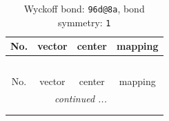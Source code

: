 \documentclass[fleqn,8pt]{jsarticle}
\begin{document}
\renewcommand{\arraystretch}{1.2}
\begin{longtable}{cccc}
\caption{Wyckoff bond: {\tt 96d@8a}, bond symmetry: {\tt 1}}
 \\
 \hline \hline
No. & vector & center & mapping \\ \hline \endfirsthead

\multicolumn{3}{l}{\tablename\ \thetable{}} \\
 \hline \hline
No. & vector & center & mapping \\ \hline \endhead

 \hline \hline
\multicolumn{3}{r}{\footnotesize\it continued ...} \\ \endfoot

 \hline \hline
\multicolumn{3}{r}{} \\ \endlastfoot


\end{longtable}
\end{document}
